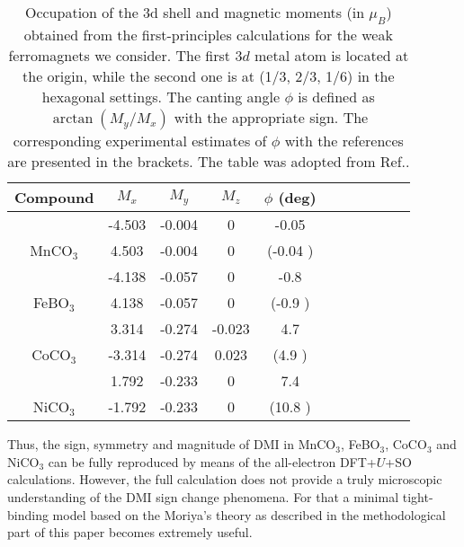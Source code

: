 \documentclass[aps,prl,twocolumn,showpacs,amsmath,amssymb]{revtex4-1}
\begin{document}
\begin{table}
\caption [Bset]{Occupation of the 3d shell and magnetic moments (in $\mu_B$) obtained from the first-principles calculations \cite{carbonates} for the weak ferromagnets we consider.
The first $3d$ metal atom is located at the origin,
while the second one is at (1/3, 2/3, 1/6) in the hexagonal settings.
The canting angle $\phi$ is defined as $\arctan(M_y/M_x)$ with the appropriate sign. The corresponding experimental estimates of $\phi$ with the references are presented in the brackets. The table was adopted from Ref.\cite{carbonates}.}
\begin {tabular}{ccccccccccc}
\hline
\hline
Compound    & $M_x$ & $M_y$ & $M_z$  &
$\phi$ (deg)  \\
\hline
                 & -4.503 & -0.004 & 0      &     -0.05    \\
MnCO$_3$     &  4.503 & -0.004 & 0      & (-0.04 \cite{Kosterov2006})\\
\hline
                & -4.138 & -0.057 & 0      &   -0.8      \\
FeBO$_3$     &  4.138 & -0.057 & 0      & (-0.9 \cite{Petrov}) \\
\hline
                 &  3.314 & -0.274 & -0.023 &     4.7   \\
CoCO$_3$     & -3.314 & -0.274 &  0.023 &  (4.9 \cite{Borovik1961,Kreines}) \\
\hline
                 &  1.792 & -0.233 & 0      &   7.4     \\
NiCO$_3$     & -1.792 & -0.233 & 0      &  (10.8 \cite{Kreines})   \\

\hline
\hline
\end{tabular}
\label{tab.abinitio}
\end{table}

Thus, the sign, symmetry and magnitude of DMI in MnCO$_3$, FeBO$_3$, CoCO$_3$ and NiCO$_3$ can be fully reproduced by means of the all-electron  DFT+$U$+SO calculations. However, the full calculation does not provide a truly microscopic understanding of the DMI sign change phenomena. 
For that a minimal tight-binding model based on the Moriya's theory as described in the methodological part of this paper becomes extremely useful.
\end{document}
